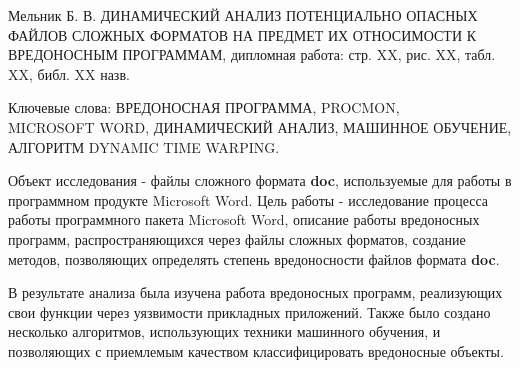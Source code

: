 
Мельник Б. В. ДИНАМИЧЕСКИЙ АНАЛИЗ ПОТЕНЦИАЛЬНО ОПАСНЫХ ФАЙЛОВ СЛОЖНЫХ ФОРМАТОВ НА ПРЕДМЕТ ИХ ОТНОСИМОСТИ К ВРЕДОНОСНЫМ ПРОГРАММАМ, дипломная работа: стр. XX, рис. XX, табл. XX, библ. XX назв.

Ключевые слова: ВРЕДОНОСНАЯ ПРОГРАММА, PROCMON, \\MICROSOFT WORD, ДИНАМИЧЕСКИЙ АНАЛИЗ, МАШИННОЕ ОБУЧЕНИЕ, АЛГОРИТМ DYNAMIC TIME WARPING.

Объект исследования - файлы сложного формата \textbf{doc}, используемые для работы в программном продукте Microsoft Word.
Цель работы - исследование процесса работы программного пакета Microsoft Word, описание работы вредоносных программ, распространяющихся через файлы сложных форматов, создание методов, позволяющих определять степень вредоносности файлов формата \textbf{doc}.

В результате анализа была изучена работа вредоносных программ, реализующих свои функции через уязвимости прикладных приложений.
Также было создано несколько алгоритмов, использующих техники машинного обучения, и позволяющих с приемлемым качеством классифицировать вредоносные объекты.